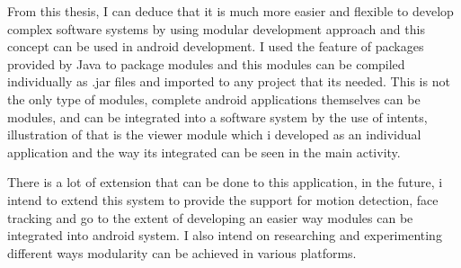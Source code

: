From this thesis, I can deduce that it is much more easier and flexible to develop complex software systems by using modular development approach and this concept can be used in android development. I used the feature of packages provided by Java  to package modules and this modules can be compiled individually as .jar files and imported to any project that its needed. This is not the only type of modules, complete android applications themselves can be modules, and can be integrated into a software system by the use of intents, illustration of that is the viewer module which i developed as an individual application and the way its integrated can be seen in the main activity.

There is a lot of extension that can be done to this application, in the future, i intend to extend this system to provide the support for motion detection, face tracking and go to the extent of developing an easier way modules can be integrated into android system. I also intend on researching and experimenting different ways modularity can be achieved in various platforms.

